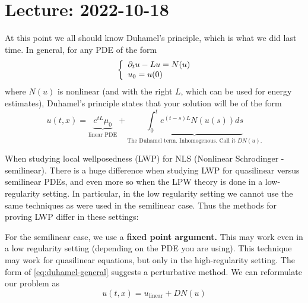 \documentclass{article}
\begin{document}
\section{Lecture: 2022-10-18}
At this point we all should know Duhamel's principle, which is what we did last
time. In general, for any PDE of the form
\begin{equation*}
  \left\{ \begin{array}{l@{}l}
      \partial_{t} u - Lu = N(u) \\
      u_{0} = u(0)
    \end{array}\right.
\end{equation*}
where $N(u)$ is nonlinear (and with the right $L$, which can be used for energy
estimates), Duhamel's principle states that your solution will be of the form
\begin{equation}\label{eq:duhamel-general}
  u(t,x) = \underbrace{e^{tL}\mu_{0}}_{\text{linear PDE}}+
  \underbrace{\int_{0}^{t}e^{(t-s)L}N(u(s))ds }_{\text{The Duhamel term.
      Inhomogenous. Call it $DN(u)$.}}
\end{equation}

When studying local wellposedness (LWP) for NLS (Nonlinear Schrodinger - semilinear). There is a huge
difference when studying LWP for quasilinear versus semilinear PDEs, and even
more so when the LPW theory is done in a low-regularity setting. In particular,
in the low regularity setting we cannot use the same techniques as were used in
the semilinear case. Thus the methods for proving LWP differ in these settings:

For the semilinear case, we use a \textbf{fixed point argument.} This
may work even in a low regularity setting (depending on the PDE you are
using). This technique may work for quasilinear equations, but only in the
high-regularity setting. The form of \cref{eq:duhamel-general} suggests a
perturbative method. We can reformulate our problem as
\begin{equation}\label{eq:11}
  u(t,x) = u_{\text{linear}} + DN(u)
\end{equation}
\end{document}
